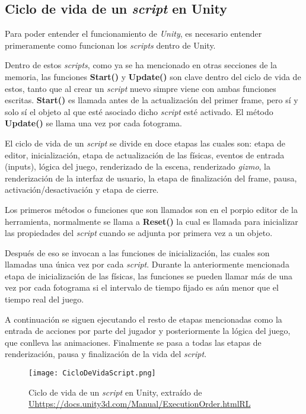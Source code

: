 \subsection{Ciclo de vida de un \textit{script} en Unity}

Para poder entender el funcionamiento de \textit{Unity}, es necesario entender primeramente como funcionan los \textit{scripts} dentro de Unity.

Dentro de estos \textit{scripts}, como ya se ha mencionado en otras secciones de la memoria, las funciones \textbf{Start()} y \textbf{Update()} son clave dentro del ciclo de vida de estos, tanto que al crear un \textit{script} nuevo simpre viene con ambas funciones escritas. \textbf{Start()} es llamada antes de la actualización del primer frame, pero sí y solo sí el objeto al que esté asociado dicho \textit{script} esté activado. El método \textbf{Update()} se llama una vez por cada fotograma.

El ciclo de vida de un \textit{script} se divide en doce etapas las cuales son: etapa de editor, inicialización, etapa de actualización de las físicas, eventos de entrada (inputs), lógica del juego, renderizado de la escena, renderizado \textit{gizmo}, la renderización de la interfaz de usuario, la etapa de finalización del frame, pausa, activación/desactivación y etapa de cierre. 

Los primeros métodos o funciones que son llamados son en el porpio editor de la herramienta, normalmente se llama a \textbf{Reset()} la cual es llamada para inicializar las propiedades del \textit{script} cuando se adjunta por primera vez a un objeto.

Después de eso se invocan a las funciones de inicialización, las cuales son llamadas una única vez por cada \textit{script}. Durante la anteriormente mencionada etapa de inicialización de las físicas, las funciones se pueden llamar más de una vez por cada fotograma si el intervalo de tiempo fijado es aún menor que el tiempo real del juego. 

A continuación se siguen ejecutando el resto de etapas mencionadas como la entrada de acciones por parte del jugador y posteriormente la lógica del juego, que conlleva las animaciones. Finalmente se pasa a todas las etapas de renderización, pausa y finalización de la vida del \textit{script}.

\begin{figure}[H]
    \centering
    \texttt{[image: CicloDeVidaScript.png]}
    \caption{Ciclo de vida de un \textit{script} en Unity, extraído de \url{Uhttps://docs.unity3d.com/Manual/ExecutionOrder.htmlRL}}
\end{figure}

